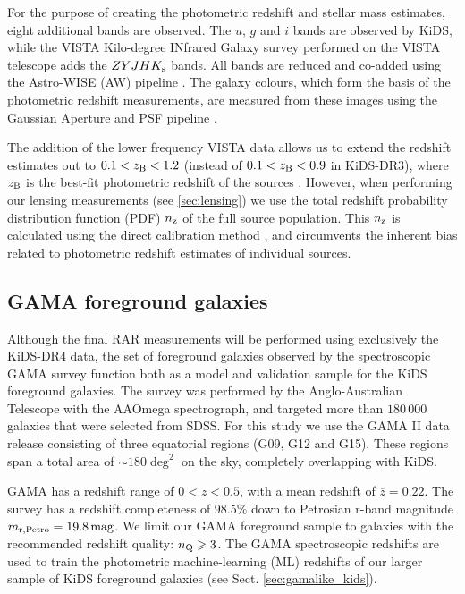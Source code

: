 \documentclass[usenatbib]{mnras}
\newcommand{\magn}{\, {\rm mag} }
\newcommand*{\mean}[1]{\overline{#1}}
\newcommand{\un}[1]{_{\rm #1}}
\begin{document}
For the purpose of creating the photometric redshift and stellar mass estimates, eight additional bands are observed. The $u$, $g$ and $i$ bands are observed by KiDS, while the VISTA Kilo-degree INfrared Galaxy survey \cite[VIKING,][]{edge2013} performed on the VISTA telescope adds the $ZYJHK_{\rm s}$ bands. All bands are reduced and co-added using the Astro-WISE (AW) pipeline \cite[]{mcfarland2013}. The galaxy colours, which form the basis of the photometric redshift measurements, are measured from these images using the Gaussian Aperture and PSF pipeline \cite[GAaP][]{kuijken2008,kuijken2015}.

The addition of the lower frequency VISTA data allows us to extend the redshift estimates out to $0.1<z\un{B}<1.2$ (instead of $0.1<z\un{B}<0.9$ in KiDS-DR3), where $z\un{B}$ is the best-fit photometric redshift of the sources \cite[]{benitez2000,hildebrandt2012}. However, when performing our lensing measurements (see \ref{sec:lensing}) we use the total redshift probability distribution function (PDF) $n\un{z}$ of the full source population. This $n\un{z}$ is calculated using the direct calibration method \cite[DIR,][]{hildebrandt2017}, and circumvents the inherent bias related to photometric redshift estimates of individual sources.

\subsection{GAMA foreground galaxies}
\label{sec:gama}

Although the final RAR measurements will be performed using exclusively the KiDS-DR4 data, the set of foreground galaxies observed by the spectroscopic GAMA survey \cite[]{driver2011} function both as a model and validation sample for the KiDS foreground galaxies. The survey was performed by the Anglo-Australian Telescope with the AAOmega spectrograph, and targeted more than $180 \, 000$ galaxies that were selected from SDSS. For this study we use the GAMA II data release \cite[]{liske2015} consisting of three equatorial regions (G09, G12 and G15). These regions span a total area of $\sim180 \deg^2$ on the sky, completely overlapping with KiDS.

GAMA has a redshift range of $0<z<0.5$, with a mean redshift of $\mean{z}=0.22$. The survey has a redshift completeness of $98.5\%$ down to Petrosian r-band magnitude $m\un{r,Petro} = 19.8 \magn$. We limit our GAMA foreground sample to galaxies with the recommended redshift quality: $n\un{Q}\geq3$. The GAMA spectroscopic redshifts are used to train the photometric machine-learning (ML) redshifts of our larger sample of KiDS foreground galaxies (see Sect. \ref{sec:gamalike_kids}).
\end{document}
